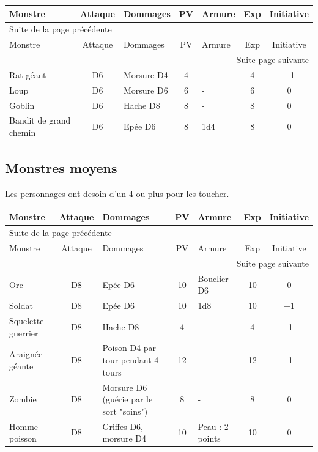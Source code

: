 \documentclass[a4paper, 11pt, twoside]{article}
\begin{document}
\begin{longtable}{p{3cm}|c|p{6cm}|c|p{1.3cm}|c|c}
Monstre & Attaque & Dommages & PV & Armure & Exp & Initiative\\
\hline
\endfirsthead
\multicolumn{7}{l}{Suite de la page précédente} \\
\hline

Monstre & Attaque & Dommages & PV & Armure & Exp & Initiative \\

\hline
\endhead
\hline\multicolumn{7}{r}{Suite page suivante} \\
\endfoot
\endlastfoot
\hline
Rat géant & D6 & Morsure D4 & 4 & - & 4 & +1\\
\hline
Loup & D6 & Morsure D6 & 6 & - & 6 & 0\\
\hline
Goblin & D6 & Hache D8 & 8 & - & 8 & 0\\
\hline
Bandit de grand chemin & D6 & Epée D6 & 8 & 1d4 & 8 & 0\\
\end{longtable}

\subsection{Monstres moyens}
\label{sec:org14876cf}

Les personnages ont desoin d'un 4 ou plus pour les toucher.

\begin{longtable}{p{3cm}|c|p{6cm}|c|p{1.3cm}|c|c}
Monstre & Attaque & Dommages & PV & Armure & Exp & Initiative\\
\hline
\endfirsthead
\multicolumn{7}{l}{Suite de la page précédente} \\
\hline

Monstre & Attaque & Dommages & PV & Armure & Exp & Initiative \\

\hline
\endhead
\hline\multicolumn{7}{r}{Suite page suivante} \\
\endfoot
\endlastfoot
\hline
Orc & D8 & Epée D6 & 10 & Bouclier D6 & 10 & 0\\
\hline
Soldat & D8 & Epée D6 & 10 & 1d8 & 10 & +1\\
\hline
Squelette guerrier & D8 & Hache D8 & 4 & - & 4 & -1\\
\hline
Araignée géante & D8 & Poison D4 par tour pendant 4 tours & 12 & - & 12 & -1\\
\hline
Zombie & D8 & Morsure D6 (guérie par le sort "soins") & 8 & - & 8 & 0\\
\hline
Homme poisson & D8 & Griffes D6, morsure D4 & 10 & Peau : 2 points & 10 & 0\\
\end{longtable}
\end{document}
